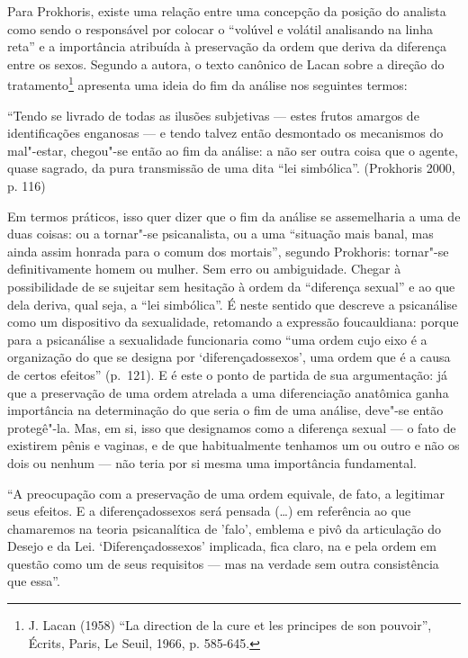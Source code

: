 Para Prokhoris, existe uma relação entre uma concepção da posição do
analista como sendo o responsável por colocar o ``volúvel e volátil
analisando na linha reta'' e a importância atribuída à preservação da
ordem que deriva da diferença entre os sexos. Segundo a autora, o texto
canônico de Lacan sobre a direção do tratamento\footnote{J. Lacan
  (1958) ``La direction de la cure et les principes de son pouvoir'',
  Écrits, Paris, Le Seuil, 1966, p. 585-645.} apresenta uma ideia do fim
da análise nos seguintes termos:

``Tendo se livrado de todas as ilusões subjetivas --- estes frutos
amargos de identificações enganosas --- e tendo talvez então desmontado
os mecanismos do mal"-estar, chegou"-se então ao fim da análise: a não
ser outra coisa que o agente, quase sagrado, da pura transmissão de uma
dita ``lei simbólica''. (Prokhoris 2000, p. 116)

Em termos práticos, isso quer dizer que o fim da análise se assemelharia
a uma de duas coisas: ou a tornar"-se psicanalista, ou a uma ``situação
mais banal, mas ainda assim honrada para o comum dos mortais'', segundo
Prokhoris: tornar"-se definitivamente homem ou mulher. Sem erro ou
ambiguidade. Chegar à possibilidade de se sujeitar sem hesitação à ordem
da ``diferença sexual'' e ao que dela deriva, qual seja, a ``lei
simbólica''. É neste sentido que descreve a psicanálise como um
dispositivo da sexualidade, retomando a expressão foucauldiana: porque
para a psicanálise a sexualidade funcionaria como ``uma ordem cujo eixo
é a organização do que se designa por `diferençadossexos', uma ordem
que é a causa de certos efeitos'' (p.~121). E é este o ponto de partida
de sua argumentação: já que a preservação de uma ordem atrelada a uma
diferenciação anatômica ganha importância na determinação do que seria o
fim de uma análise, deve"-se então protegê"-la. Mas, em si, isso que
designamos como a diferença sexual --- o fato de existirem pênis e
vaginas, e de que habitualmente tenhamos um ou outro e não os dois ou
nenhum --- não teria por si mesma uma importância fundamental.

``A preocupação com a preservação de uma ordem equivale, de fato, a
legitimar seus efeitos. E a diferençadossexos será pensada (\ldots{})
em referência ao que chamaremos na teoria psicanalítica de 'falo',
emblema e pivô da articulação do Desejo e da Lei. `Diferençadossexos'
implicada, fica claro, na e pela ordem em questão como um de seus
requisitos --- mas na verdade sem outra consistência que essa''.


